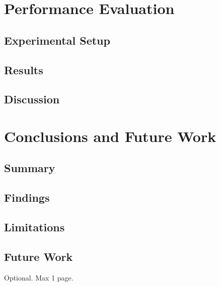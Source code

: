 \documentclass[12pt,a4paper,openright,twoside]{book}
\begin{document}
\chapter{Performance Evaluation}
\label{chap:evaluation}

\section{Experimental Setup}

\section{Results}

\section{Discussion}

\chapter{Conclusions and Future Work}
\label{chap:conclusions}

\section{Summary}

\section{Findings}

\section{Limitations}

\section{Future Work}

\backmatter





\begin{acknowledgements}
Optional. Max 1 page.
\end{acknowledgements}
\end{document}
